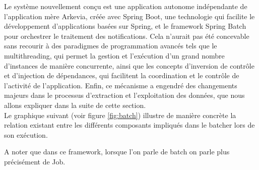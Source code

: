 Le système nouvellement conçu est une application autonome indépendante de l'application mère Arkevia, créée avec Spring Boot, une technologie qui facilite le développement d'applications basées sur Spring, et le framework Spring Batch pour orchestrer le traitement des notifications. Cela n'aurait pas été concevable sans recourir à des paradigmes de programmation avancés tels que le multithreading, qui permet la gestion et l'exécution d'un grand nombre d'instances de manière concurrente, ainsi que les concepts d'inversion de contrôle et d'injection de dépendances, qui facilitent la coordination et le contrôle de l'activité de l'application. Enfin, ce mécanisme a engendré des changements majeurs dans le processus d'extraction et l'exploitation des données, que nous allons expliquer dans la suite de cette section.\\

Le graphique suivant (voir figure \ref{fig:batch}) illustre de manière concrète la relation existant entre les différents composants impliqués dans le batcher lors de son exécution.
\begin{beware}[title=Note : ]
A noter que dans ce framework, lorsque l’on parle de batch on parle plus précisément de Job.
\end{beware}
    
